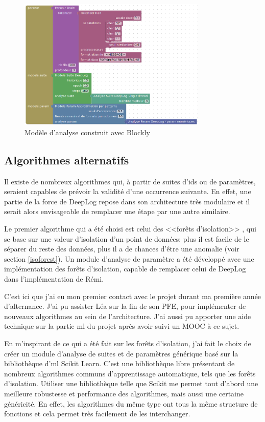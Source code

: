 \documentclass[openany, 11pt]{memoir}
\begin{document}
\begin{figure}[ht]
	\centering
	\includegraphics[width=0.8\textwidth]{images/blockly_deeplog.png}
	\caption{Modèle d'analyse construit avec Blockly}
	\label{blocklydeeplog}
\end{figure}

\subsection{Algorithmes alternatifs}

Il existe de nombreux algorithmes qui, à partir de suites d'ids ou de paramètres, seraient capables de prévoir la validité d'une occurrence suivante. En effet, une partie de la force de DeepLog repose dans son architecture très modulaire et il serait alors envisageable de remplacer une étape par une autre similaire.

Le premier algorithme qui a été choisi est celui des <<forêts d'isolation>> \cite{isolationforest}, qui se base sur une valeur d'isolation d'un point de données: plus il est facile de le séparer du reste des données, plus il a de chances d'être une anomalie (voir section \ref{isoforest}). Un module d'analyse de paramètre a été développé avec une implémentation des forêts d'isolation, capable de remplacer celui de DeepLog dans l'implémentation de Rémi.

\bigskip
C'est ici que j'ai eu mon premier contact avec le projet durant ma première année d'alternance. J'ai pu assister Léa sur la fin de son PFE, pour implémenter de nouveaux algorithmes au sein de l'architecture. J'ai aussi pu apporter une aide technique sur la partie \gls{ml} du projet après avoir suivi un MOOC à ce sujet.

En m'inspirant de ce qui a été fait sur les forêts d'isolation, j'ai fait le choix de créer un module d'analyse de suites et de paramètres générique basé sur la bibliothèque d'\gls{ml} Scikit Learn. C'est une bibliothèque libre présentant de nombreux algorithmes communs d'apprentissage automatique, tels que les forêts d'isolation. Utiliser une bibliothèque telle que Scikit me permet tout d'abord une meilleure robustesse et performance des algorithmes, mais aussi une certaine généricité. En effet, les algorithmes du même type ont tous la même structure de fonctions et cela permet très facilement de les interchanger.
\end{document}
